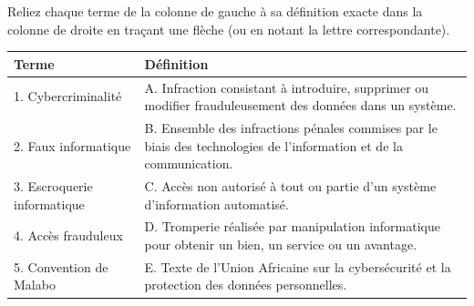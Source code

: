 \documentclass[11pt]{article}
\begin{document}
\begin{exercice}
Reliez chaque terme de la colonne de gauche à sa définition exacte dans la colonne de droite en traçant une flèche (ou en notant la lettre correspondante).
\begin{center}
\begin{tabular}{|p{5cm}|p{5cm}|}
\hline
\textbf{Terme} & \textbf{Définition} \\
\hline
1. Cybercriminalité & A. Infraction consistant à introduire, supprimer ou modifier frauduleusement des données dans un système. \\
\hline
2. Faux informatique & B. Ensemble des infractions pénales commises par le biais des technologies de l'information et de la communication. \\
\hline
3. Escroquerie informatique & C. Accès non autorisé à tout ou partie d'un système d'information automatisé. \\
\hline
4. Accès frauduleux & D. Tromperie réalisée par manipulation informatique pour obtenir un bien, un service ou un avantage. \\
\hline
5. Convention de Malabo & E. Texte de l'Union Africaine sur la cybersécurité et la protection des données personnelles. \\
\hline
\end{tabular}
\end{center}
\end{exercice}
\end{document}
